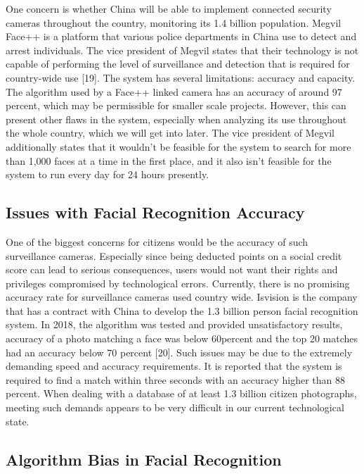 \documentclass[letterpaper, 10 pt, conference]{ieeeconf}  %
\begin{document}
One concern is whether China will be able to implement connected security cameras throughout the country, monitoring its 1.4 billion population. Megvil Face++ is a platform that various police departments in China use to detect and arrest individuals. The vice president of Megvil states that their technology is not capable of performing the level of surveillance and detection that is required for country-wide use [19]. The system has several limitations: accuracy and capacity. The algorithm used by a Face++ linked camera has an accuracy of around 97 percent, which may be permissible for smaller scale projects. However, this can present other flaws in the system, especially when analyzing its use throughout the whole country, which we will get into later. The vice president of Megvil additionally states that it wouldn’t be feasible for the system to search for more than 1,000 faces at a time in the first place, and it also isn’t feasible for the system to run every day for 24 hours presently.
\subsection{Issues with Facial Recognition Accuracy}

One of the biggest concerns for citizens would be the accuracy of such surveillance cameras. Especially since being deducted points on a social credit score can lead to serious consequences, users would not want their rights and privileges compromised by technological errors. Currently, there is no promising accuracy rate for surveillance cameras used country wide. Isvision is the company that has a contract with China to develop the 1.3 billion person facial recognition system. In 2018, the algorithm was tested and provided unsatisfactory results, accuracy of a photo matching a face was below 60percent and the top 20 matches had an accuracy below 70 percent [20]. Such issues may be due to the extremely demanding speed and accuracy requirements. It is reported that the system is required to find a match within three seconds with an accuracy higher than 88 percent. When dealing with a database of at least 1.3 billion citizen photographs, meeting such demands appears to be very difficult in our current technological state.
\subsection{Algorithm Bias in Facial Recognition}
\end{document}
